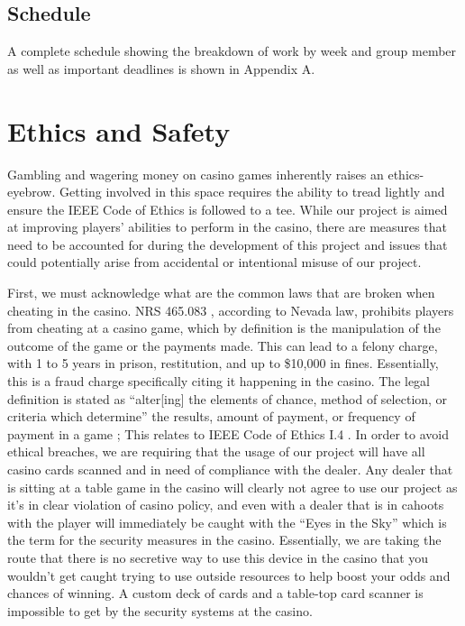 \documentclass[12pt]{article}
\begin{document}
\subsection{Schedule}

A complete schedule showing the breakdown of work by week and group member as well as important deadlines is shown in Appendix A.

\section{Ethics and Safety}

Gambling and wagering money on casino games inherently raises an ethics-eyebrow. Getting involved in this space requires the ability to tread lightly and ensure the IEEE Code of Ethics \cite{IEEE_ethics} is followed to a tee. While our project is aimed at improving players' abilities to perform in the casino, there are measures that need to be accounted for during the development of this project and issues that could potentially arise from accidental or intentional misuse of our project. 

First, we must acknowledge what are the common laws that are broken when cheating in the casino. NRS 465.083 \cite{NRS}, according to Nevada law, prohibits players from cheating at a casino game, which by definition is the manipulation of the outcome of the game or the payments made. This can lead to a felony charge, with 1 to 5 years in prison, restitution, and up to \$10,000 in fines. Essentially, this is a fraud charge specifically citing it happening in the casino. The legal definition is stated as ``alter[ing] the elements of chance, method of selection, or criteria which determine'' the results, amount of payment, or frequency of payment in a game \cite{NRS}; This relates to IEEE Code of Ethics I.4 \cite{IEEE_ethics}. In order to avoid ethical breaches, we are requiring that the usage of our project will have all casino cards scanned and in need of compliance with the dealer. Any dealer that is sitting at a table game in the casino will clearly not agree to use our project as it's in clear violation of casino policy, and even with a dealer that is in cahoots with the player will immediately be caught with the ``Eyes in the Sky'' which is the term for the security measures in the casino. Essentially, we are taking the route that there is no secretive way to use this device in the casino that you wouldn't get caught trying to use outside resources to help boost your odds and chances of winning. A custom deck of cards and a table-top card scanner is impossible to get by the security systems at the casino. 
\end{document}
